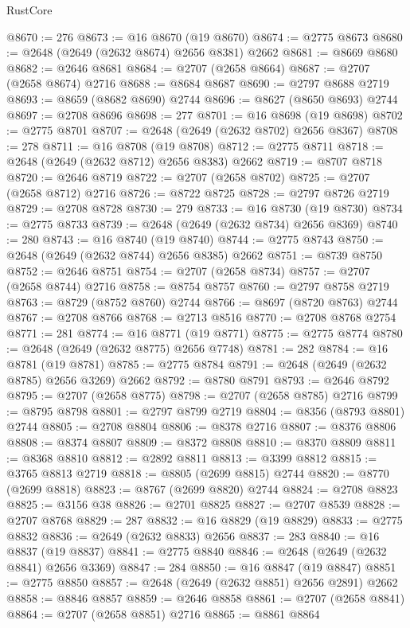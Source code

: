 \begin{lexlean}{RustCore}
\begin{coremodule}
@8670 := 276
@8673 := @16 @8670 (@19 @8670)
@8674 := @2775 @8673
@8680 := @2648 (@2649 (@2632 @8674) @2656 @8381) @2662
@8681 := @8669 @8680
@8682 := @2646 @8681
@8684 := @2707 (@2658 @8664)
@8687 := @2707 (@2658 @8674) @2716
@8688 := @8684 @8687
@8690 := @2797 @8688 @2719
@8693 := @8659 (@8682 @8690) @2744
@8696 := @8627 (@8650 @8693) @2744
@8697 := @2708 @8696
@8698 := 277
@8701 := @16 @8698 (@19 @8698)
@8702 := @2775 @8701
@8707 := @2648 (@2649 (@2632 @8702) @2656 @8367)
@8708 := 278
@8711 := @16 @8708 (@19 @8708)
@8712 := @2775 @8711
@8718 := @2648 (@2649 (@2632 @8712) @2656 @8383) @2662
@8719 := @8707 @8718
@8720 := @2646 @8719
@8722 := @2707 (@2658 @8702)
@8725 := @2707 (@2658 @8712) @2716
@8726 := @8722 @8725
@8728 := @2797 @8726 @2719
@8729 := @2708 @8728
@8730 := 279
@8733 := @16 @8730 (@19 @8730)
@8734 := @2775 @8733
@8739 := @2648 (@2649 (@2632 @8734) @2656 @8369)
@8740 := 280
@8743 := @16 @8740 (@19 @8740)
@8744 := @2775 @8743
@8750 := @2648 (@2649 (@2632 @8744) @2656 @8385) @2662
@8751 := @8739 @8750
@8752 := @2646 @8751
@8754 := @2707 (@2658 @8734)
@8757 := @2707 (@2658 @8744) @2716
@8758 := @8754 @8757
@8760 := @2797 @8758 @2719
@8763 := @8729 (@8752 @8760) @2744
@8766 := @8697 (@8720 @8763) @2744
@8767 := @2708 @8766
@8768 := @2713 @8516
@8770 := @2708 @8768 @2754
@8771 := 281
@8774 := @16 @8771 (@19 @8771)
@8775 := @2775 @8774
@8780 := @2648 (@2649 (@2632 @8775) @2656 @7748)
@8781 := 282
@8784 := @16 @8781 (@19 @8781)
@8785 := @2775 @8784
@8791 := @2648 (@2649 (@2632 @8785) @2656 @3269) @2662
@8792 := @8780 @8791
@8793 := @2646 @8792
@8795 := @2707 (@2658 @8775)
@8798 := @2707 (@2658 @8785) @2716
@8799 := @8795 @8798
@8801 := @2797 @8799 @2719
@8804 := @8356 (@8793 @8801) @2744
@8805 := @2708 @8804
@8806 := @8378 @2716
@8807 := @8376 @8806
@8808 := @8374 @8807
@8809 := @8372 @8808
@8810 := @8370 @8809
@8811 := @8368 @8810
@8812 := @2892 @8811
@8813 := @3399 @8812
@8815 := @3765 @8813 @2719
@8818 := @8805 (@2699 @8815) @2744
@8820 := @8770 (@2699 @8818)
@8823 := @8767 (@2699 @8820) @2744
@8824 := @2708 @8823
@8825 := @3156 @38
@8826 := @2701 @8825
@8827 := @2707 @8539
@8828 := @2707 @8768
@8829 := 287
@8832 := @16 @8829 (@19 @8829)
@8833 := @2775 @8832
@8836 := @2649 (@2632 @8833) @2656
@8837 := 283
@8840 := @16 @8837 (@19 @8837)
@8841 := @2775 @8840
@8846 := @2648 (@2649 (@2632 @8841) @2656 @3369)
@8847 := 284
@8850 := @16 @8847 (@19 @8847)
@8851 := @2775 @8850
@8857 := @2648 (@2649 (@2632 @8851) @2656 @2891) @2662
@8858 := @8846 @8857
@8859 := @2646 @8858
@8861 := @2707 (@2658 @8841)
@8864 := @2707 (@2658 @8851) @2716
@8865 := @8861 @8864

\end{coremodule}
\end{lexlean}
